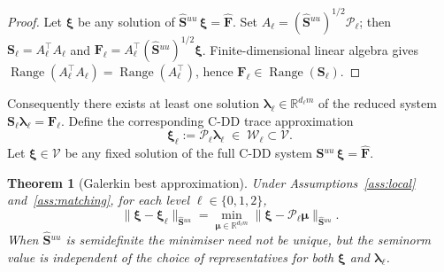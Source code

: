 \documentclass[11pt,a4paper]{article}
\newtheorem{theorem}{Theorem}[section]
\theoremstyle{definition}
\newcommand{\R}{\mathbb{R}}
\newcommand{\trac}{\bm{\lambda}}
\newcommand{\Schur}{\mathbf{S}}
\newcommand{\Shatuu}{\widehat{\Schur}{}^{uu}}
\newcommand{\Fhat}{\widehat{\bm{F}}}
\newcommand{\Range}{\operatorname{Range}}
\newcommand{\Vspace}{\mathcal{V}}
\newcommand{\Wspace}{\mathcal{W}}
\newcommand{\Pcal}{\mathcal{P}}
\begin{document}
\begin{proof}
  Let $\bm{\xi}$ be any solution of $\Shatuu\,\bm{\xi} = \Fhat$.
  Set $A_\ell = (\Shatuu)^{1/2}\Pcal_\ell$; then
  $\Schur_\ell = A_\ell^\top A_\ell$ and
  $\bm{F}_\ell = A_\ell^\top (\Shatuu)^{1/2}\bm{\xi}$.
  Finite-dimensional linear algebra gives
  $\Range(A_\ell^\top A_\ell) = \Range(A_\ell^\top)$,
  hence $\bm{F}_\ell \in \Range(\Schur_\ell)$.
\end{proof}

Consequently there exists at least one solution $\trac_\ell \in
\R^{d_\ell m}$ of the reduced system
$\Schur_\ell \trac_\ell = \bm{F}_\ell$.
Define the corresponding C-DD trace approximation
\begin{equation}\label{eq:xi-ell}
  \bm{\xi}_\ell := \Pcal_\ell \trac_\ell \;\in\; \Wspace_\ell \subset \Vspace.
\end{equation}
Let $\bm{\xi} \in \Vspace$ be any fixed solution of the full C-DD
system $\Shatuu\,\bm{\xi} = \Fhat$.

\begin{theorem}[Galerkin best approximation]\label{thm:best}
  Under Assumptions~\ref{ass:local} and~\ref{ass:matching},
  for each level $\ell\in\{0,1,2\}$,
  \begin{equation}\label{eq:best}
    \|\bm{\xi} - \bm{\xi}_\ell\|_{\Shatuu}
    = \min_{\bm{\mu}\in\R^{d_\ell m}}
      \|\bm{\xi} - \Pcal_\ell\bm{\mu}\|_{\Shatuu}.
  \end{equation}
  When $\Shatuu$ is semidefinite the minimiser need not be unique,
  but the seminorm value is independent of the choice of
  representatives for both $\bm{\xi}$ and $\trac_\ell$.
\end{theorem}
\end{document}
